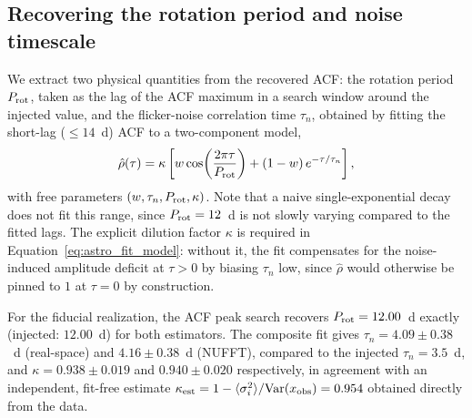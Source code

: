 \documentclass[twocolumn,10pt]{article}
\begin{document}
\subsection{Recovering the rotation period and noise timescale}
\label{sec:astro_fit}
%
We extract two physical quantities from the recovered ACF: the
rotation period $P_{\rm rot}$, taken as the lag of the ACF maximum in
a search window around the injected value, and the flicker-noise
correlation time $\tau_n$, obtained by fitting the short-lag ($\le
14$~d) ACF to a two-component model,
\begin{equation}
\hat\rho(\tau) = \kappa\left[w\cos\!\left(\frac{2\pi\tau}{P_{\rm rot}}\right) + (1-w)\,e^{-\tau/\tau_n}\right],
\label{eq:astro_fit_model}
\end{equation}
with free parameters $(w, \tau_n, P_{\rm rot}, \kappa)$. Note that a naive
single-exponential decay does not fit this range, since $P_{\rm
rot}=12$~d is not slowly varying compared to the fitted lags. The
explicit dilution factor $\kappa$ is required in
Equation~\ref{eq:astro_fit_model}: without it, the fit compensates for
the noise-induced amplitude deficit at $\tau>0$ by biasing $\tau_n$
low, since $\hat\rho$ would otherwise be pinned to $1$ at $\tau=0$ by
construction.

For the fiducial realization, the ACF peak search recovers $P_{\rm
rot}=12.00$~d exactly (injected: $12.00$~d) for both estimators. The
composite fit gives $\tau_n=4.09\pm0.38$~d (real-space) and
$4.16\pm0.38$~d (NUFFT), compared to the injected $\tau_n=3.5$~d, and
$\kappa=0.938\pm0.019$ and $0.940\pm0.020$ respectively, in agreement
with an independent, fit-free estimate $\kappa_{\rm
est}=1-\langle\sigma_i^2\rangle/\mathrm{Var}(x_{\rm obs})=0.954$
obtained directly from the data.
%
\end{document}
